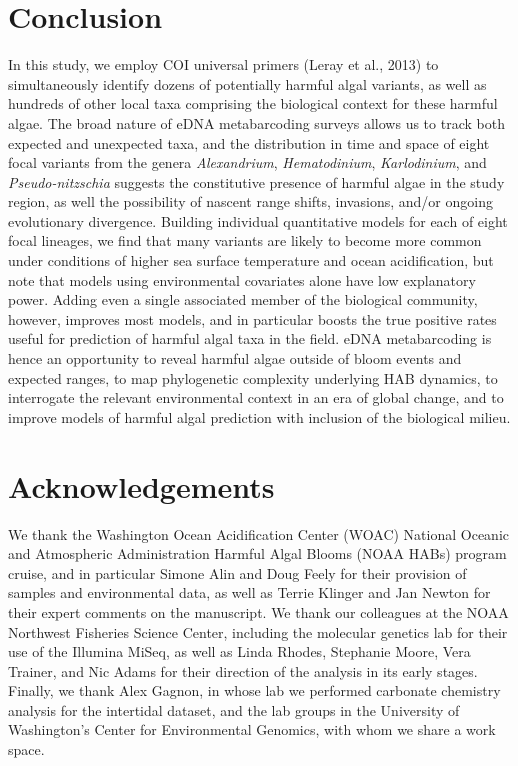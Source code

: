 \documentclass[
]{article}
\begin{document}
\hypertarget{conclusion}{%
\section{Conclusion}\label{conclusion}}

In this study, we employ COI universal primers (Leray et al., 2013) to
simultaneously identify dozens of potentially harmful algal variants, as
well as hundreds of other local taxa comprising the biological context
for these harmful algae. The broad nature of eDNA metabarcoding surveys
allows us to track both expected and unexpected taxa, and the
distribution in time and space of eight focal variants from the genera
\emph{Alexandrium}, \emph{Hematodinium}, \emph{Karlodinium}, and
\emph{Pseudo-nitzschia} suggests the constitutive presence of harmful
algae in the study region, as well the possibility of nascent range
shifts, invasions, and/or ongoing evolutionary divergence. Building
individual quantitative models for each of eight focal lineages, we find
that many variants are likely to become more common under conditions of
higher sea surface temperature and ocean acidification, but note that
models using environmental covariates alone have low explanatory power.
Adding even a single associated member of the biological community,
however, improves most models, and in particular boosts the true
positive rates useful for prediction of harmful algal taxa in the field.
eDNA metabarcoding is hence an opportunity to reveal harmful algae
outside of bloom events and expected ranges, to map phylogenetic
complexity underlying HAB dynamics, to interrogate the relevant
environmental context in an era of global change, and to improve models
of harmful algal prediction with inclusion of the biological milieu.

\hypertarget{acknowledgements}{%
\section{Acknowledgements}\label{acknowledgements}}

We thank the Washington Ocean Acidification Center (WOAC) National
Oceanic and Atmospheric Administration Harmful Algal Blooms (NOAA HABs)
program cruise, and in particular Simone Alin and Doug Feely for their
provision of samples and environmental data, as well as Terrie Klinger
and Jan Newton for their expert comments on the manuscript. We thank our
colleagues at the NOAA Northwest Fisheries Science Center, including the
molecular genetics lab for their use of the Illumina MiSeq, as well as
Linda Rhodes, Stephanie Moore, Vera Trainer, and Nic Adams for their
direction of the analysis in its early stages. Finally, we thank Alex
Gagnon, in whose lab we performed carbonate chemistry analysis for the
intertidal dataset, and the lab groups in the University of Washington's
Center for Environmental Genomics, with whom we share a work space.
\end{document}
